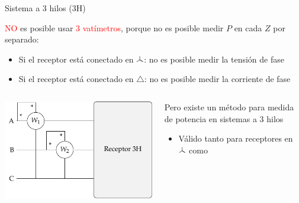 \documentclass[aspectratio=169, usenames,svgnames,dvipsnames]{beamer}
\newcommand\wye{\scalerel*{\stackengine{-1pt}{%
  \rotatebox[origin=c]{30}{\rule{10pt}{.9pt}}\kern-1pt%
  \rotatebox[origin=c]{-30}{\rule{10pt}{1.3pt}}}{%
  \rule{.9pt}{10pt}}{O}{c}{F}{F}{S}}{\Delta}} %
\begin{document}
\begin{frame}{Sistema a 3 hilos (3H)}

    \vspace{2mm}
    \textcolor{red}{NO} es posible usar \textcolor{red}{3 vatímetros}, porque no es posible medir $P$ en cada $Z$ \alert{por separado}:
    
    \begin{itemize}
        \item Si el \alert{receptor} está conectado en $\wye$: no es posible medir la \alert{tensión de fase}

        \vspace{1mm}
        \item Si el \alert{receptor} está conectado en $\triangle$: no es posible medir la \alert{corriente de fase}
    \end{itemize}
    
    \begin{columns}
    \begin{column}{0.44\linewidth}

        \vspace{4mm}

        \hspace*{-3mm}
        \includegraphics[width=1\linewidth]{../figs/Potencia3H.pdf}
    \end{column}
    \begin{column}{0.53\linewidth}

        \vspace{2mm}
        Pero \alert{existe un método} para medida de potencia en sistemas a 3 hilos

        \vspace{1mm}
        \begin{itemize}
            \item Válido tanto para receptores en $\wye$ como 
            

\end{itemize}
\end{column}
\end{columns}
\end{frame}
\end{document}
